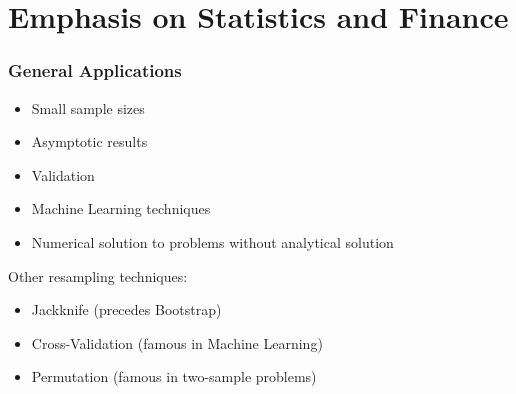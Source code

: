 \documentclass[9pt, dvipsnames]{beamer} %
\begin{document}
    \section{Emphasis on Statistics and Finance}
    \begin{frame}
    	\frametitle{\textbf{General Applications}}
    	\begin{itemize}
    		\item Small sample sizes
    		\item Asymptotic results
    		\item Validation
    		\item Machine Learning techniques
    		\item Numerical solution to problems without analytical solution
    	\end{itemize}
    	\begin{alertblock}{ }
    		Other resampling techniques:
    		\begin{itemize}
    			\item Jackknife (precedes Bootstrap)
    			\item Cross-Validation (famous in Machine Learning)
    			\item Permutation (famous in two-sample problems)
    		\end{itemize}
    	\end{alertblock}
    \end{frame}
\end{document}
